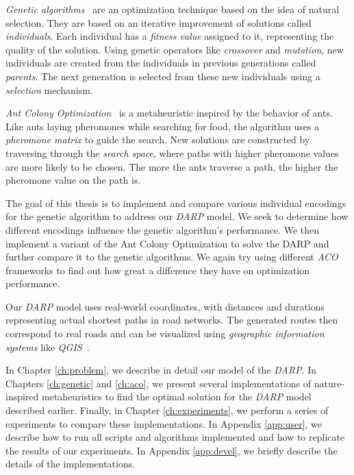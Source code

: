 \textit{Genetic algorithms}~\cite{Holland:1992} are an optimization technique based on the idea of natural selection. They are based on an iterative improvement of solutions called \textit{individuals}. Each individual has a \textit{fitness value} assigned to it, representing the quality of the solution. Using genetic operators like \textit{crossover} and \textit{mutation}, new individuals are created from the individuals in previous generations called \textit{parents}. The next generation is selected from these new individuals using a \textit{selection} mechanism.

\textit{Ant Colony Optimization}~\cite{Dorigo2010} is a metaheuristic inspired by the behavior of ants. Like ants laying pheromones while searching for food, the algorithm uses a \textit{pheromone matrix} to guide the search. New solutions are constructed by traversing through the \textit{search space}, where paths with higher pheromone values are more likely to be chosen. The more the ants traverse a path, the higher the pheromone value on the path is.

The goal of this thesis is to implement and compare various individual encodings for the genetic algorithm to address our \textit{DARP} model. We seek to determine how different encodings influence the genetic algorithm's performance. We then implement a variant of the Ant Colony Optimization to solve the DARP and further compare it to the genetic algorithms. We again try using different \textit{ACO} frameworks to find out how great a difference they have on optimization performance.

Our \textit{DARP} model uses real-world coordinates, with distances and durations representing actual shortest paths in road networks. The generated routes then correspond to real roads and can be visualized using \textit{geographic information systems} like \textit{QGIS}~\cite{QGIS_software}.

In Chapter \ref{ch:problem}, we describe in detail our model of the \textit{DARP}. In Chapters \ref{ch:genetic} and \ref{ch:aco}, we present several implementations of nature-inspired metaheuristics to find the optimal solution for the \textit{DARP} model described earlier. Finally, in Chapter \ref{ch:experiments}, we perform a series of experiments to compare these implementations. In Appendix \ref{app:user}, we describe how to run all scripts and algorithms implemented and how to replicate the results of our experiments. In Appendix \ref{app:devel}, we briefly describe the details of the implementations.

